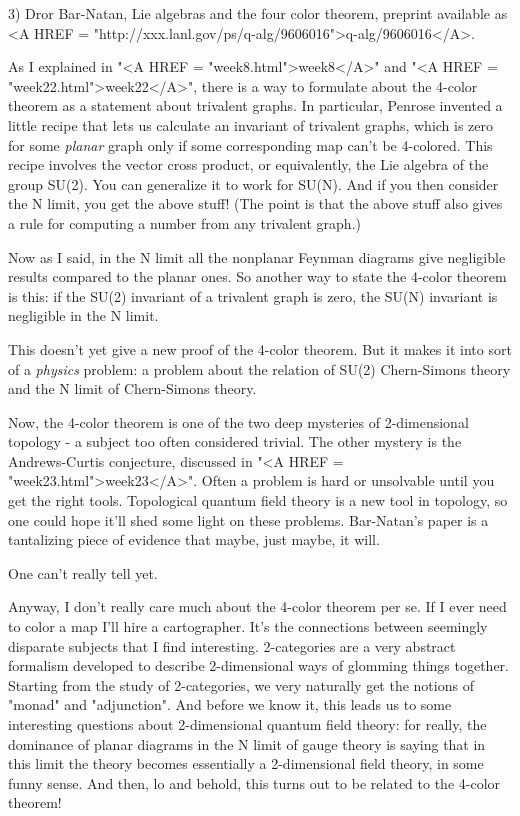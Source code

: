 3) Dror Bar-Natan, Lie algebras and the four color theorem, preprint
available as <A HREF = "http://xxx.lanl.gov/ps/q-alg/9606016">q-alg/9606016</A>.

As I explained in "<A HREF = "week8.html">week8</A>" and "<A HREF = "week22.html">week22</A>", there is a way to formulate
about the 4-color theorem as a statement about trivalent graphs.
In particular, Penrose invented a little recipe that lets us calculate an 
invariant of trivalent graphs, which is zero for some \emph{planar} graph
only if some corresponding map can't be 4-colored.  This recipe involves 
the vector cross product, or equivalently, the Lie algebra of the group SU(2).  
You can generalize it to work for SU(N).  And if you then consider the 
N \to  \infty  limit, you get the above stuff!  (The point is that
the above stuff also gives a rule for computing a number from any 
trivalent graph.)

Now as I said, in the N \to  \infty  limit all the nonplanar Feynman diagrams 
give negligible results compared to the planar ones.  So another way to state 
the 4-color theorem is this: if the SU(2) invariant of a trivalent graph
is zero, the SU(N) invariant is negligible in the N \to  \infty  limit.

This doesn't yet give a new proof of the 4-color theorem.  But it makes
it into sort of a \emph{physics} problem: a problem about the relation of
SU(2) Chern-Simons theory and the N \to  \infty  limit of Chern-Simons
theory.  

Now, the 4-color theorem is one of the two deep mysteries of 2-dimensional
topology - a subject too often considered trivial.  The other mystery is
the Andrews-Curtis conjecture, discussed in "<A HREF = "week23.html">week23</A>".  Often a problem
is hard or unsolvable until you get the right tools.  Topological quantum
field theory is a new tool in topology, so one could hope it'll shed
some light on these problems.  Bar-Natan's paper is a tantalizing piece
of evidence that maybe, just maybe, it will.

One can't really tell yet.   

Anyway, I don't really care much about the 4-color theorem per se.  
If I ever need to color a map I'll hire a cartographer.   It's the
connections between seemingly disparate subjects that I find interesting.
2-categories are a very abstract formalism developed to describe 
2-dimensional ways of glomming things together.  Starting from the study
of 2-categories, we very naturally get the notions of "monad" and "adjunction".
And before we know it, this leads us to some interesting questions
about 2-dimensional quantum field theory: for really, the dominance of
planar diagrams in the N \to  \infty  limit of gauge theory is saying that in 
this limit the theory becomes essentially a 2-dimensional field theory, 
in some funny sense.  And then, lo and behold, this turns out to be related to 
the 4-color theorem!  

